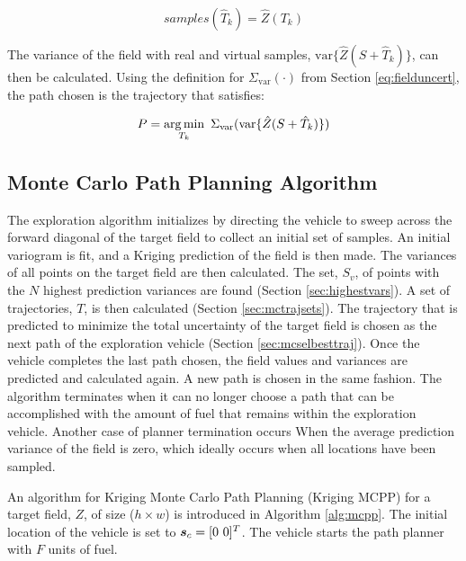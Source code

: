 \begin{equation}
	samples(\hat{T}_k) = \hat{Z}(T_k)
\end{equation}

\noindent The variance of the field with real and virtual samples, $\text{var}\{\hat{Z}(S+\hat{T}_k)\}$, can then be calculated. Using the definition for $\Sigma_{\text{var}}(\cdot)$ from Section \ref{eq:fielduncert}, the path chosen is the trajectory that satisfies:

\begin{equation}
	\label{eq:mcfoundpath}
	P = \argmin_{T_k}\ \Sigma_{\text{var}}(\text{var}\{\hat{Z}(S+\hat{T}_k)\})
\end{equation}

\subsection{Monte Carlo Path Planning Algorithm}
The exploration algorithm initializes by directing the vehicle to sweep across the forward diagonal of the target field to collect an initial set of samples. An initial variogram is fit, and a Kriging prediction of the field is then made. The variances of all points on the target field are then calculated. The set, $S_{v}$, of points with the $N$ highest prediction variances are found (Section \ref{sec:highestvars}). A set of trajectories, $T$, is then calculated (Section \ref{sec:mctrajsets}). The trajectory that is predicted to minimize the total uncertainty of the target field is chosen as the next path of the exploration vehicle (Section \ref{sec:mcselbesttraj}). Once the vehicle completes the last path chosen, the field values and variances are predicted and calculated again. A new path is chosen in the same fashion. The algorithm terminates when it can no longer choose a path that can be accomplished with the amount of fuel that remains within the exploration vehicle. Another case of planner termination occurs When the average prediction variance of the field is zero, which ideally occurs when all locations have been sampled.

An algorithm for Kriging Monte Carlo Path Planning (Kriging MCPP) for a target field, $Z$, of size ($h\times w$) is introduced in Algorithm \ref{alg:mcpp}. The initial location of the vehicle is set to $\vect{s}_{c} = [0\ 0]^T$. The vehicle starts the path planner with $F$ units of fuel.


